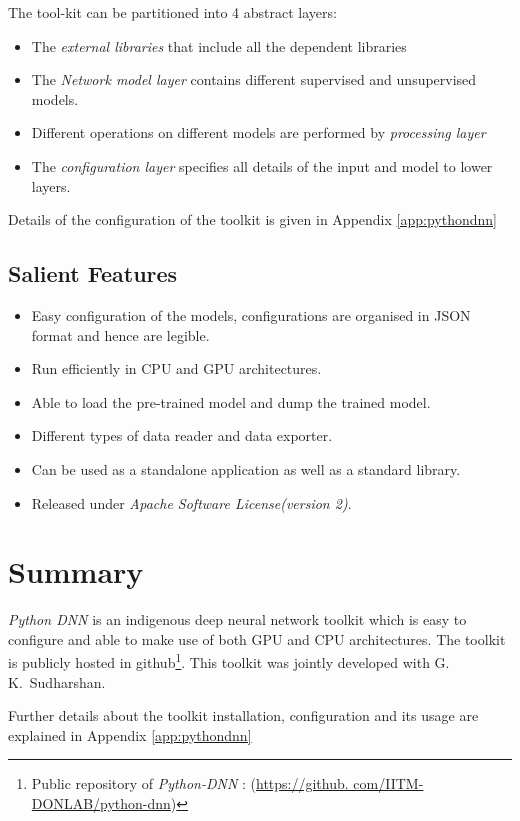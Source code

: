 \noindent The tool-kit can be partitioned into 4 abstract layers:
\begin{itemize}
\item The \textit{external libraries} that include all the dependent libraries
\item The \textit{Network model layer} contains different supervised and unsupervised models.
\item Different operations on different models are performed by \textit{processing layer}
\item The \textit{configuration layer} specifies all details of the input and model to lower layers.
\end{itemize}

Details of the configuration of the toolkit is given in Appendix \ref{app:pythondnn}

\subsection{Salient Features}
\label{sec:python-dnnFeatures}
\begin{itemize}
\item Easy configuration of the models, configurations
are organised in JSON format and hence are legible.
\item Run efficiently in CPU and GPU architectures.
\item Able to load the pre-trained model and dump the trained model.
\item Different types of data reader and data exporter.
\item Can be used as a standalone application as well as a standard  library.
\item Released under \textit{Apache Software License(version 2)}.\\
\end{itemize}

\section{Summary}
\textit{Python DNN} is an indigenous deep neural network toolkit which is easy to configure and able to make use of both GPU and CPU architectures.  The toolkit is publicly hosted in github\footnote{Public repository of \textit{Python-DNN} : (\url{https://github.  com/IITM-DONLAB/python-dnn})}.  This toolkit was jointly developed with G.~ K.~Sudharshan.

Further details about the toolkit installation, configuration and its usage are explained in Appendix \ref{app:pythondnn}
